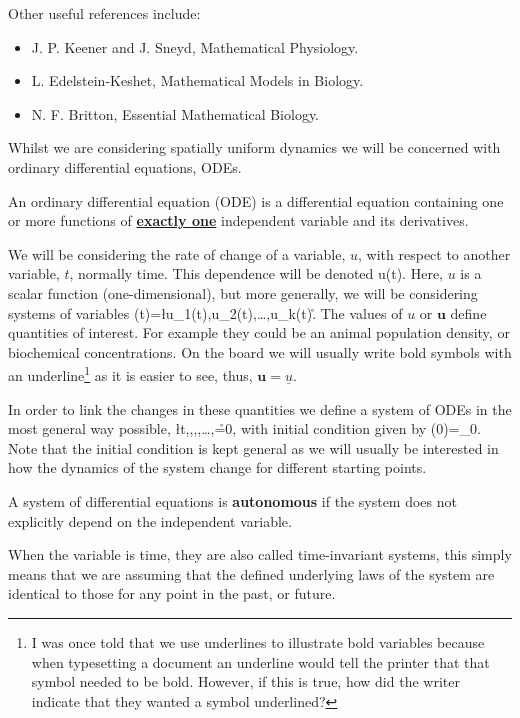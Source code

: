 Other useful references include:
\begin{itemize}
\item J. P. Keener and J. Sneyd, Mathematical Physiology.
\item L. Edelstein-Keshet, Mathematical Models in Biology.
\item N. F. Britton, Essential Mathematical Biology.
\end{itemize}
Whilst we are considering spatially uniform dynamics we will be concerned with ordinary differential equations, ODEs.

\begin{defin}
An ordinary differential equation (ODE) is a differential equation containing one or more functions of \underline{\textbf{exactly one}} independent variable and its derivatives.
\end{defin}

We will be considering the rate of change of a variable, $u$, with respect to another variable, $t$, normally time. This dependence will be denoted
\bb
u(t).
\ee
Here, $u$ is a scalar function (\ie one-dimensional), but more generally, we will be considering systems of variables
\bb
{}(t)=\l u_1(t),u_2(t),\dots,u_k(t)\r.
\ee
The values of $u$ or $\bm{u}$ define quantities of interest. For example they could be an animal population density, or biochemical concentrations. On the board we will usually write bold symbols with an underline\footnote{I was once told that we use underlines to illustrate bold variables because when typesetting a document an underline would tell the printer that that symbol needed to be bold. However, if this is true, how did the writer indicate that they wanted a symbol underlined?} as it is easier to see, thus, $\bm{u}=\underline{u}$.


In order to link the changes in these quantities we define a system of ODEs in the most general way possible,
\bb
{}\l t,,,,\dots,\r=0,
\ee
with initial condition given by
\bb
{}(0)=_0.
\ee
Note that the initial condition is kept general as we will usually be interested in how the dynamics of the system change for different starting points.

\begin{defin}
A system of differential equations is \textbf{autonomous} if the system does not explicitly depend on the independent variable.
\end{defin}
When the variable is time, they are also called time-invariant systems, this simply means that we are assuming that the defined underlying laws of the system are identical to those for any point in the past, or future.

